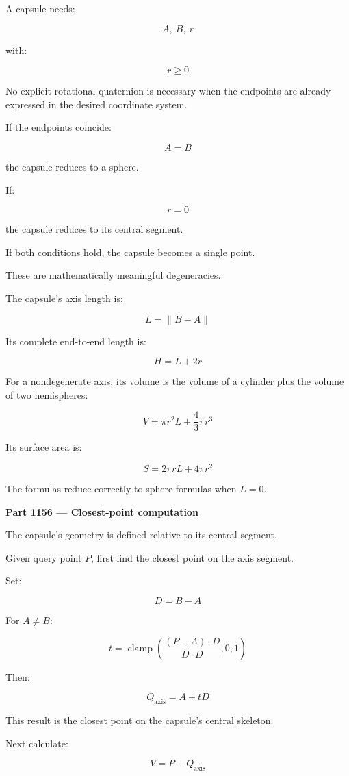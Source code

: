 A capsule needs:

\[
A,\ B,\ r
\]

with:

\[
r\ge0
\]

No explicit rotational quaternion is necessary when the endpoints are already expressed in the desired coordinate system.

If the endpoints coincide:

\[
A=B
\]

the capsule reduces to a sphere.

If:

\[
r=0
\]

the capsule reduces to its central segment.

If both conditions hold, the capsule becomes a single point.

These are mathematically meaningful degeneracies.

The capsule's axis length is:

\[
L=\|B-A\|
\]

Its complete end-to-end length is:

\[
H=L+2r
\]

For a nondegenerate axis, its volume is the volume of a cylinder plus the volume of two hemispheres:

\[
\boxed{ V=\pi r^2L+\frac43\pi r^3 }
\]

Its surface area is:

\[
\boxed{ S=2\pi rL+4\pi r^2 }
\]

The formulas reduce correctly to sphere formulas when \(L=0\).

\textbf{Part 1156 --- Closest-point computation}

The capsule's geometry is defined relative to its central segment.

Given query point \(P\), first find the closest point on the axis segment.

Set:

\[
D=B-A
\]

For \(A\ne B\):

\[
t=\operatorname{clamp} \left( \frac{(P-A)\cdot D}{D\cdot D}, 0,1 \right)
\]

Then:

\[
\boxed{Q_{\mathrm{axis}}=A+tD}
\]

This result is the closest point on the capsule's central skeleton.

Next calculate:

\[
V=P-Q_{\mathrm{axis}}
\]

